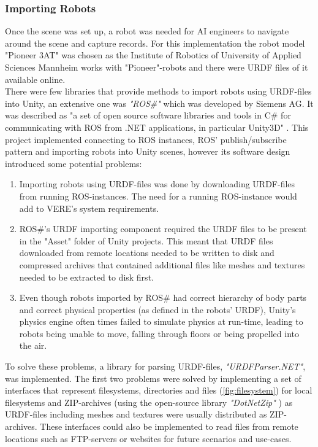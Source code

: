 \subsubsection{Importing Robots}
Once the scene was set up, a robot was needed for \acs{AI} engineers to navigate around the scene and capture records. For this implementation the robot model "Pioneer 3AT" was chosen as the Institute of Robotics of University of Applied Sciences Mannheim works with "Pioneer"-robots and there were \ac{URDF} files of it available \cite{AmrRosConfig} online.\\
There were few libraries that provide methods to import robots using URDF-files into Unity, an extensive one was \textit{"ROS\#"} which was developed by Siemens AG. It was described as "a set of open source software libraries and tools in C\# for communicating with ROS from .NET applications, in particular Unity3D" \cite{RosSharp}. This project implemented connecting to ROS instances, ROS' publish/subscribe pattern and importing robots into Unity scenes, however its software design introduced some potential problems: 
\begin{enumerate}
    \item Importing robots using URDF-files was done by downloading URDF-files from running ROS-instances. The need for a running ROS-instance would add to VERE's system requirements.
    \item ROS\#'s URDF importing component required the URDF files to be present in the "Asset" folder of Unity projects. This meant that URDF files downloaded from remote locations needed to be written to disk and compressed archives that contained additional files like meshes and textures needed to be extracted to disk first.
    \item Even though robots imported by ROS\# had correct hierarchy of body parts and correct physical properties (as defined in the robots' URDF), Unity's physics engine often times failed to simulate physics at run-time, leading to robots being unable to move, falling through floors or being propelled into the air.
\end{enumerate}
To solve these problems, a library for parsing URDF-files, \textit{"URDFParser.NET"}, was implemented. The first two problems were solved by implementing a set of interfaces that represent filesystems, directories and files (\ref{fig:filesystem}) for local filesystems and ZIP-archives (using the open-source library \textit{"DotNetZip"} \cite{DotNetZip}) as URDF-files including meshes and textures were usually distributed as ZIP-archives. These interfaces could also be implemented to read files from remote locations such as FTP-servers or websites for future scenarios and use-cases.
